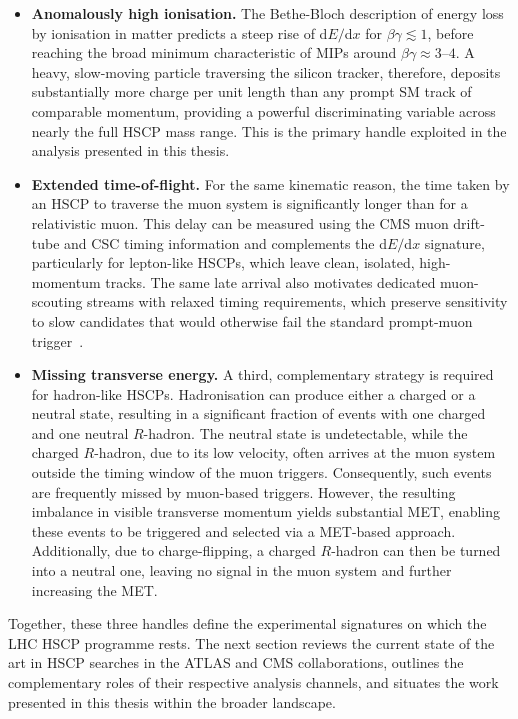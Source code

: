 \begin{itemize}
    \item \textbf{Anomalously high ionisation.} The Bethe-Bloch description of energy loss by ionisation in matter predicts a steep rise of d$E/$d$x$ for $\beta\gamma\lesssim 1$, before reaching the broad minimum characteristic of MIPs around $\beta\gamma\approx 3$--$4$. A heavy, slow-moving particle traversing the silicon tracker, therefore, deposits substantially more charge per unit length than any prompt SM track of comparable momentum, providing a powerful discriminating variable across nearly the full HSCP mass range. This is the primary handle exploited in the analysis presented in this thesis.

    \item \textbf{Extended time-of-flight.} For the same kinematic reason, the time taken by an HSCP to traverse the muon system is significantly longer than for a relativistic muon. This delay can be measured using the CMS muon drift-tube and CSC timing information and complements the d$E/$d$x$ signature, particularly for lepton-like HSCPs, which leave clean, isolated, high-momentum tracks. The same late arrival also motivates dedicated muon-scouting streams with relaxed timing requirements, which preserve sensitivity to slow candidates that would otherwise fail the standard prompt-muon trigger~\cite{cmscollaboration2026searchheavylonglivedcharged}.

    \item \textbf{Missing transverse energy.} A third, complementary strategy is required for hadron-like HSCPs. Hadronisation can produce either a charged or a neutral state, resulting in a significant fraction of events with one charged and one neutral $R$-hadron. The neutral state is undetectable, while the charged $R$-hadron, due to its low velocity, often arrives at the muon system outside the timing window of the muon triggers. Consequently, such events are frequently missed by muon-based triggers. However, the resulting imbalance in visible transverse momentum yields substantial MET, enabling these events to be triggered and selected via a MET-based approach. Additionally, due to charge-flipping, a charged $R$-hadron can then be turned into a neutral one, leaving no signal in the muon system and further increasing the MET.
\end{itemize}

Together, these three handles define the experimental signatures on which the LHC HSCP programme rests. The next section reviews the current state of the art in HSCP searches in the ATLAS and CMS collaborations, outlines the complementary roles of their respective analysis channels, and situates the work presented in this thesis within the broader landscape.


